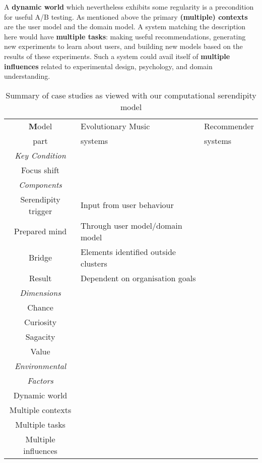 A \textbf{dynamic world} which nevertheless exhibits some regularity
is a precondition for useful A/B testing.  As mentioned above the
primary \textbf{(multiple) contexts} are the user model and the domain
model.  A system matching the description here would have
\textbf{multiple tasks}: making useful recommendations, generating new
experiments to learn about users, and building new models based on the
results of these experiments.  Such a system could avail itself of
\textbf{multiple influences} related to experimental design,
psychology, and domain understanding.


\begin{table}%
\caption{Summary of case studies as viewed with our computational serendipity model}
\begin{center}
\begin{tabular}{|c|l|l|}
\hline
{\textbf Model}  & Evolutionary Music & Recommender \\
part & systems & systems \\
\hline
{\em Key Condition}  && \\
Focus shift && \\
\hline
{\em Components} && \\
Serendipity trigger & Input from user behaviour & \\
Prepared mind  & Through user model/domain model & \\
Bridge  & Elements identified outside clusters & \\
Result & Dependent on organisation goals & \\
\hline
{\em Dimensions} && \\
Chance && \\
Curiosity && \\
Sagacity && \\
Value && \\
\hline
{\em Environmental} && \\
{\em Factors} && \\
Dynamic world && \\
Multiple contexts && \\
Multiple tasks && \\
Multiple influences && \\
\hline
\end{tabular}
\end{center}
\label{caseStudies}
\end{table}%

